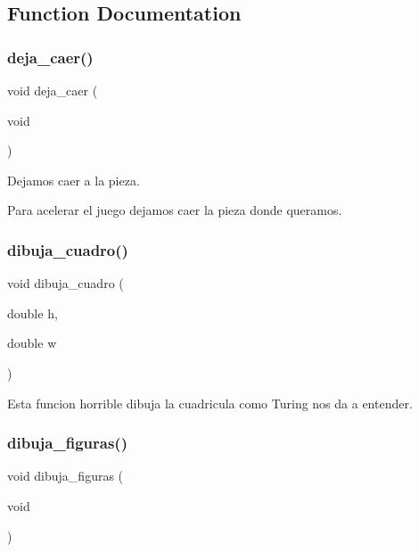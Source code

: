 \subsection{Function Documentation}
\mbox{\label{interfaz-grafica_8c_a0374c9d1b952aa94d93bb6cfd7ba0352}} 
\subsubsection{\texorpdfstring{deja\+\_\+caer()}{deja\_caer()}}
{\footnotesize\ttfamily void deja\+\_\+caer (\begin{DoxyParamCaption}\item[{void}]{ }\end{DoxyParamCaption})}



Dejamos caer a la pieza. 

Para acelerar el juego dejamos caer la pieza donde queramos. \mbox{\label{interfaz-grafica_8c_aa120e3999a9d7ad9473f08f4b49e79c6}} 
\subsubsection{\texorpdfstring{dibuja\+\_\+cuadro()}{dibuja\_cuadro()}}
{\footnotesize\ttfamily void dibuja\+\_\+cuadro (\begin{DoxyParamCaption}\item[{double}]{h,  }\item[{double}]{w }\end{DoxyParamCaption})}

Esta funcion horrible dibuja la cuadricula como Turing nos da a entender. \mbox{\label{interfaz-grafica_8c_a5ba0624ca1f1a8027f803d6fe70f6838}} 
\subsubsection{\texorpdfstring{dibuja\+\_\+figuras()}{dibuja\_figuras()}}
{\footnotesize\ttfamily void dibuja\+\_\+figuras (\begin{DoxyParamCaption}\item[{void}]{ }\end{DoxyParamCaption})}



